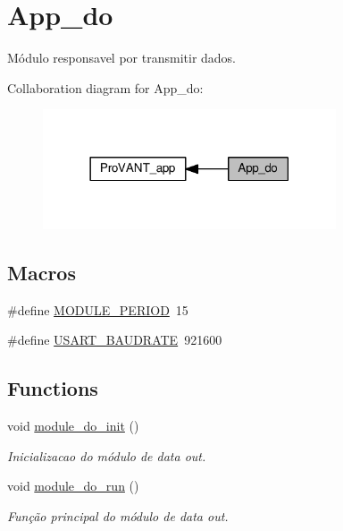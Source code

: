 \hypertarget{group__app__do}{}\section{App\+\_\+do}
\label{group__app__do}


Módulo responsavel por transmitir dados.  


Collaboration diagram for App\+\_\+do\+:\nopagebreak
\begin{figure}[H]
\begin{center}
\leavevmode
\includegraphics[width=246pt]{group__app__do}
\end{center}
\end{figure}
\subsection*{Macros}
\begin{DoxyCompactItemize}
\item 
\#define \hyperlink{group__app__do_ga0ac6c9f2991b096e49c354e5cce6fae0}{M\+O\+D\+U\+L\+E\+\_\+\+P\+E\+R\+I\+OD}~15
\item 
\#define \hyperlink{group__app__do_ga6a53a6c94a70cc286e300a0ea8f46ba4}{U\+S\+A\+R\+T\+\_\+\+B\+A\+U\+D\+R\+A\+TE}~921600
\end{DoxyCompactItemize}
\subsection*{Functions}
\begin{DoxyCompactItemize}
\item 
void \hyperlink{group__app__do_ga901c023651503207f5cfd8cdb8c305b3}{module\+\_\+do\+\_\+init} ()
\begin{DoxyCompactList}\small\item\em Inicializacao do módulo de data out. \end{DoxyCompactList}\item 
void \hyperlink{group__app__do_ga1f08b4b431624465a47f47eca0520253}{module\+\_\+do\+\_\+run} ()
\begin{DoxyCompactList}\small\item\em Função principal do módulo de data out. \end{DoxyCompactList}\end{DoxyCompactItemize}
